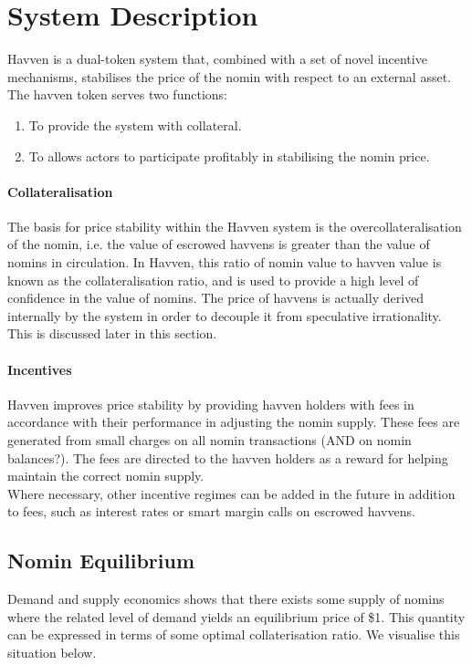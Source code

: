 \section{System Description} Havven is a dual-token system that, combined with a set of novel incentive mechanisms, stabilises the price of the nomin with respect to an external asset. \\

\noindent The havven token serves two functions:

\begin{enumerate}
\item{To provide the system with collateral.}
\item{To allows actors to participate profitably in stabilising the nomin price.}
\end{enumerate}

\paragraph{Collateralisation}

\noindent The basis for price stability within the Havven system is the overcollateralisation of the nomin, i.e. the value of escrowed havvens is greater than the value of nomins in circulation. In Havven, this ratio of nomin value to havven value is known as the collateralisation ratio, and is used to provide a high level of confidence in the value of nomins. The price of havvens is actually derived internally by the system in order to decouple it from speculative irrationality. This is discussed later in this section.

\paragraph{Incentives}

\noindent Havven improves price stability by providing havven holders with fees in accordance with their performance in adjusting the nomin supply. These fees are generated from small charges on all nomin transactions (AND on nomin balances?). The fees are directed to the havven holders as a reward for helping maintain the correct nomin supply. \\

\noindent Where necessary, other incentive regimes can be added in the future in addition to fees, such as interest rates or smart margin calls on escrowed havvens.

\newpage
\subsection{Nomin Equilibrium} Demand and supply economics shows that there exists some supply of nomins where the related level of demand yields an equilibrium price of \$1. This quantity can be expressed in terms of some optimal collaterisation ratio. We visualise this situation below. \\

